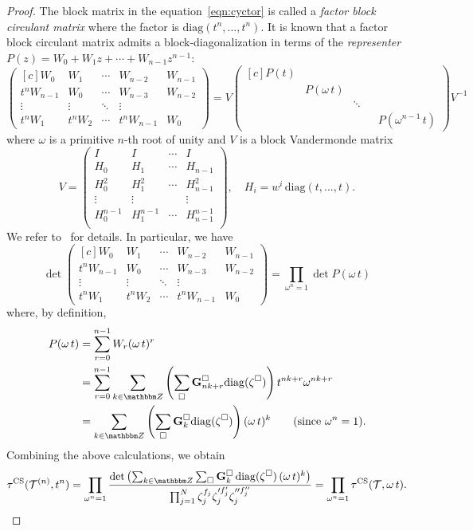 \documentclass[12pt,reqno]{amsart}
\theoremstyle{definition}
\def\BZ{\mathbbm Z}
\def\calT{\mathcal T}
\def\be{\begin{equation}}
\def\ee{\end{equation}}
\def\CS{\mathrm{CS}}
\def\diag{\mathrm{diag}}
\begin{document}
\begin{proof}
The block matrix in the equation~\eqref{eqn:cyctor} is called a
\emph{factor block circulant matrix} where the factor is  $\diag(t^n,\ldots, t^n)$.
It is known that a factor block circulant matrix admits a block-diagonalization
in terms of the \emph{representer} $P(z)= W_0+W_1 z +\cdots + W_{n-1}z^{n-1}$:
\be
\begin{pmatrix*}[c]
	W_0 &  W_1& \cdots &  W_{n-2} & W_{n-1} \\
	t^{n} W_{n-1} &  W_0& \cdots&  W_{n-3} & W_{n-2}  \\
	\vdots & \vdots & \ddots & \vdots \\
	t^{n} W_1 & t^n W_2& \cdots & t^n  W_{n-1} &W_0 
\end{pmatrix*} = V \begin{pmatrix*}[c]
 P(t) &   &  &   & \\
 &   P(\omega \, t) &  &   &   \\
 &  & \ddots &  \\
  & &  &  & P(\omega^{n-1} \, t) 
\end{pmatrix*} V^{-1}
\ee
where $\omega$ is a primitive $n$-th root of unity and $V$ is a block Vandermonde
matrix
\be
V= \begin{pmatrix}
I & I &\cdots  & I \\
H_0  &H_1 &\cdots & H_{n-1} \\
H_0^2  &H_1^2 &\cdots & H_{n-1}^2 \\
\vdots & \vdots & & \vdots \\
H_0^{n-1}  &H_1^{n-1} &\cdots & H_{n-1}^{n-1}\\		
\end{pmatrix}, \quad H_i = w^{i} \, \diag(t,\ldots,t).
\ee
We refer to~\cite{circulant} for details. In particular, we have
\be	
\det \begin{pmatrix*}[c]
W_0 &  W_1& \cdots &  W_{n-2} & W_{n-1} \\
t^{n} W_{n-1} &  W_0& \cdots&  W_{n-3} & W_{n-2}  \\
\vdots & \vdots & \ddots & \vdots \\
t^{n} W_1 & t^n W_2& \cdots & t^n  W_{n-1} &W_0 
\end{pmatrix*} =\prod_{\omega^n=1} \det P(\omega\, t)
\ee
where, by definition,
\begin{align*}
P(\omega\, t) &= \sum_{r=0}^{n-1} W_r (\omega\, t)^r \\
&=\sum_{r=0}^{n-1} \sum_{k \in \BZ} \left( \sum_\square
  \mathbf{G}_{nk+r}^{\square} \mathrm{diag} (\zeta^\square) \right) t^{nk+r} \omega^{nk+r}
\\
&=\sum_{k \in \BZ} \left(\sum_\square \mathbf{G}_{k}^{\square}
  \mathrm{diag} (\zeta^\square)\right)(\omega\, t)^{k}
\qquad (\text{since} \,\, \omega^n=1).
\end{align*}
Combining the above calculations, we obtain
\be 
\tau^{\CS}(\calT^{(n)},t^n)  =
\prod_{\omega^n=1} \frac{\det\left(\sum_{k\in\BZ}
  \sum_\square  \mathbf{G}_{k}^{\square}\,
      \mathrm{diag} (\zeta^\square)\,(\omega\, t)^{k}\right)}{
  \prod_{j=1}^N\zeta_j^{f_j} \zeta_j'^{f_j'} \zeta_j''^{f_j''}} =
\prod_{\omega^n=1} \tau^{\CS}(\calT, \omega\, t).
\ee
\end{proof}
\end{document}
